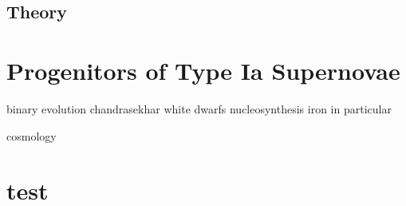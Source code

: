 \subsection{Theory}


\section{Progenitors of Type Ia Supernovae}
\label{sec:snia_progenitor}
binary evolution
chandrasekhar
white dwarfs
nucleosynthesis
iron in particular

cosmology


\section{test}




